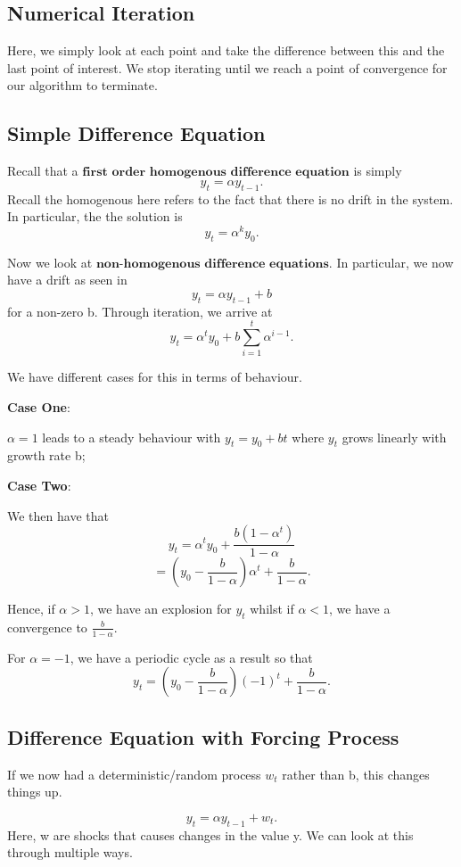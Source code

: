 \documentclass[twoside]{article}
\begin{document}
\subsection{Numerical Iteration}
Here, we simply look at each point and take the difference between this and the last point of interest. We stop iterating until we reach a point of convergence for our algorithm to terminate.

\subsection{Simple Difference Equation}
Recall that a $\textbf{first order homogenous difference equation}$ is simply
$$
y_t = \alpha y_{t-1}.
$$
Recall the homogenous here refers to the fact that there is no drift in the system. In particular, the the solution is
$$
y_t = \alpha^ky_0.
$$

\bigskip
Now we look at $\textbf{non-homogenous difference equations}$. In particular, we now have a drift as seen in 
$$
y_t = \alpha y_{t-1} + b
$$
for a non-zero b. Through iteration, we arrive at
$$
y_t = \alpha^ty_0 + b\sum_{i=1}^t\alpha^{i-1}.
$$

We have different cases for this in terms of behaviour.

\textbf{Case One}:

$\alpha = 1$ leads to a steady behaviour with $y_t = y_0 + bt$ where $y_t$ grows linearly with growth rate b;

\textbf{Case Two}:

We then have that 
$$
y_t = \alpha^ty_0 + \frac{b(1 - \alpha^t)}{1 - \alpha}
$$
\bigskip
$$
= (y_0 - \frac{b}{1 - \alpha})\alpha^t + \frac{b}{1 - \alpha}.
$$

Hence, if $\alpha > 1$, we have an explosion for $y_t$ whilst if $\alpha < 1$, we have a convergence to $\frac{b}{1 - \alpha}$.

For $\alpha = -1$, we have a periodic cycle as a result so that
$$
y_t = (y_0 - \frac{b}{1 - \alpha})(-1)^t + \frac{b}{1 - \alpha}.
$$

\subsection{Difference Equation with Forcing Process}
If we now had a deterministic/random process $w_t$ rather than b, this changes things up.

$$
y_t = \alpha y_{t-1} + w_t.
$$
Here, w are shocks that causes changes in the value y. We can look at this through multiple ways.
\end{document}
